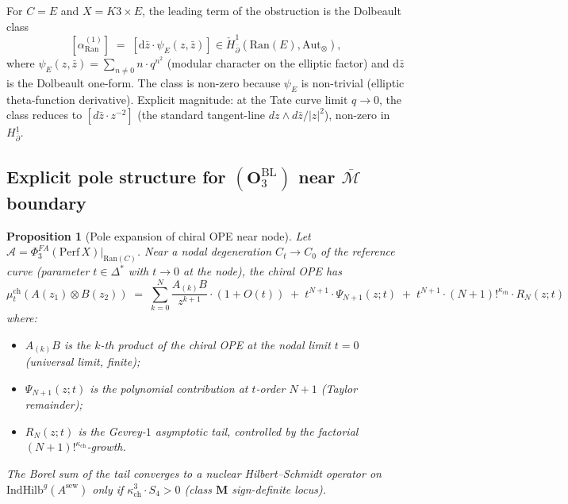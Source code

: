 \documentclass[11pt]{amsart}
\newtheorem{proposition}[theorem]{Proposition}
\newcommand{\kch}{\kappa_{\mathrm{ch}}}
\newcommand{\cA}{\mathcal{A}}
\newcommand{\Ran}{\mathrm{Ran}}
\newcommand{\IndHilb}{\mathrm{IndHilb}}
\newcommand{\Mbar}{\overline{\mathcal{M}}}
\newcommand{\Perf}{\mathrm{Perf}}
\begin{document}
\begin{example}[Explicit class on $C = E$ elliptic curve, $X = K3 \times E$]
\label{ex:ran-E-explicit}
For $C = E$ and $X = K3 \times E$, the leading term of the
obstruction is the Dolbeault class
\[
[\alpha_{\mathrm{Ran}}^{(1)}] \;=\;
[\mathrm{d}\bar z \cdot \psi_E(z, \bar z)]
\in \check{H}^1_{\bar\partial}(\Ran(E), \mathrm{Aut}_\otimes),
\]
where $\psi_E(z, \bar z) = \sum_{n \neq 0} n \cdot q^{n^2}$
(modular character on the elliptic factor) and $\mathrm{d}\bar z$
is the Dolbeault one-form. The class is non-zero because
$\psi_E$ is non-trivial (elliptic theta-function derivative).
Explicit magnitude: at the Tate curve limit $q \to 0$, the class
reduces to $[d\bar z \cdot z^{-2}]$ (the standard tangent-line
$dz \wedge d\bar z /|z|^2$), non-zero in $H^1_{\bar\partial}$.
\end{example}

\subsection{Explicit pole structure for $(\mathbf{O}_3^{\mathrm{BL}})$
near $\Mbar$ boundary}

\begin{proposition}[Pole expansion of chiral OPE near node]
\label{prop:pole-expansion}
Let $\cA = \Phi^{FA}_3(\Perf\,X)|_{\Ran(C)}$. Near a nodal degeneration
$C_t \to C_0$ of the reference curve (parameter $t \in \Delta^*$
with $t \to 0$ at the node), the chiral OPE has
\[
\mu^{\mathrm{ch}}_t(A(z_1) \otimes B(z_2))
\;=\; \sum_{k=0}^{N} \frac{A_{(k)} B}{z^{k+1}} \cdot (1 + O(t))
\;+\; t^{N+1} \cdot \Psi_{N+1}(z; t) \;+\; t^{N+1} \cdot (N+1)!^{\kch}
\cdot R_N(z; t)
\]
where:
\begin{itemize}[leftmargin=2em]
\item $A_{(k)} B$ is the $k$-th product of the chiral OPE at
the nodal limit $t = 0$ (universal limit, finite);
\item $\Psi_{N+1}(z; t)$ is the polynomial contribution at
$t$-order $N+1$ (Taylor remainder);
\item $R_N(z; t)$ is the Gevrey-$1$ asymptotic tail, controlled by
the factorial $(N+1)!^{\kch}$-growth.
\end{itemize}
The Borel sum of the tail converges to a nuclear
Hilbert--Schmidt operator on $\IndHilb^g(A^{\mathrm{sew}})$ only if
$\kch^3 \cdot S_4 > 0$ (class $\mathbf{M}$ sign-definite locus).
\end{proposition}
\end{document}
